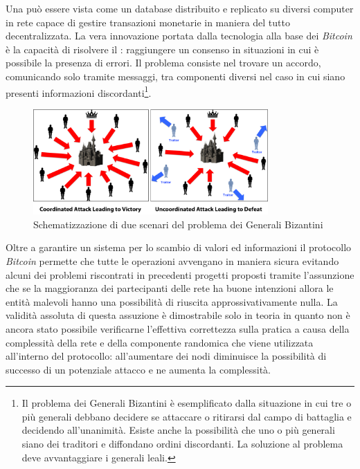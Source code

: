 Una  può essere vista come un database distribuito e replicato su diversi computer in rete capace di gestire transazioni monetarie in maniera del tutto decentralizzata.\newline\newline
La vera innovazione portata dalla tecnologia alla base dei \textit{Bitcoin} è la capacità di risolvere il : raggiungere un consenso in situazioni in cui è possibile la presenza di errori.\newline
Il problema consiste nel trovare un accordo, comunicando solo tramite messaggi, tra componenti diversi nel caso in cui siano presenti informazioni discordanti\footnote{Il problema dei Generali Bizantini è esemplificato dalla situazione in cui tre o più generali debbano decidere se attaccare o ritirarsi dal campo di battaglia e decidendo all'unanimità. Esiste anche la possibilità che uno o più generali siano dei traditori e diffondano ordini discordanti. La soluzione al problema deve avvantaggiare i generali leali.}.\newline
\begin{figure}
    \centering
    \includegraphics[width=0.8\textwidth]{images/byzantine.png}
    \caption{Schematizzazione di due scenari del problema dei Generali Bizantini}
\end{figure}
Oltre a garantire un sistema per lo scambio di valori ed informazioni il protocollo \textit{Bitcoin} permette che tutte le operazioni avvengano in maniera sicura evitando alcuni dei problemi riscontrati in precedenti progetti proposti tramite l'assunzione che se la maggioranza dei partecipanti delle rete ha buone intenzioni allora le entità malevoli hanno una possibilità di riuscita approssivativamente nulla.\newline
La validità assoluta di questa assuzione è dimostrabile solo in teoria in quanto non è ancora stato possibile verificarne l'effettiva correttezza sulla pratica a causa della complessità della rete e della componente randomica che viene utilizzata all'interno del protocollo: all'aumentare dei nodi diminuisce la possibilità di successo di un potenziale attacco e ne aumenta la complessità.\newline
